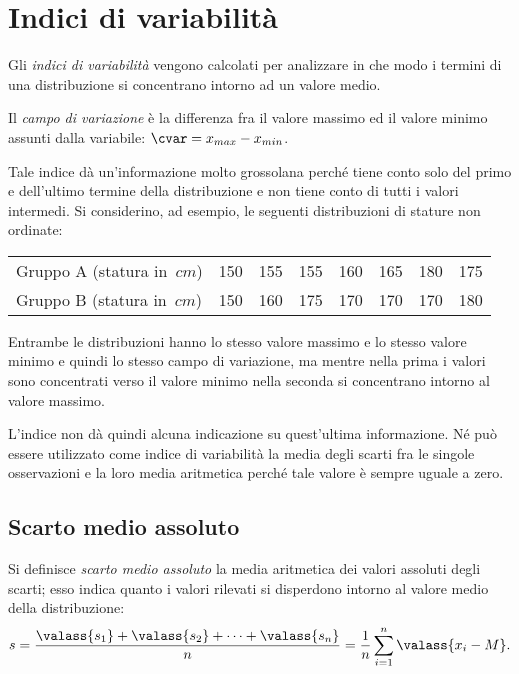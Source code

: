 \ovalbox{\risolvii \ref{ese:A.21}, \ref{ese:A.22}, \ref{ese:A.23}, \ref{ese:A.24}, \ref{ese:A.25}, \ref{ese:A.26}, \ref{ese:A.27}, \ref{ese:A.28}, \ref{ese:A.29}, \ref{ese:A.30}, \ref{ese:A.31}}

\vspazio\ovalbox{\ref{ese:A.32}}
\section{Indici di variabilità}

Gli \emph{indici di variabilità} vengono calcolati per analizzare in che modo i termini di una distribuzione si concentrano intorno ad un valore medio.

\begin{definizione}
Il \emph{campo di variazione} è la differenza fra il valore massimo ed il valore minimo assunti dalla
variabile: $\cvar = x_{max} - x_{min}$.
\end{definizione}

Tale indice dà un'informazione molto grossolana perché tiene conto solo del primo e dell'ultimo termine della
distribuzione e non tiene conto di tutti i valori intermedi. Si considerino, ad esempio, le seguenti distribuzioni di stature non ordinate:
\begin{center}
 \begin{tabular}{lccccccc}
 \toprule
 Gruppo A (statura in~$\unit{cm}$) & 150 & 155 & 155 & 160 & 165 & 180 & 175 \\
 Gruppo B (statura in~$\unit{cm}$) & 150 & 160 & 175 & 170 & 170 & 170 & 180 \\
 \bottomrule
\end{tabular}
\end{center}

Entrambe le distribuzioni hanno lo stesso valore massimo e lo stesso valore minimo e quindi lo stesso campo di
variazione, ma mentre nella prima i valori sono concentrati verso il valore minimo nella seconda si concentrano intorno al valore massimo.

L'indice non dà quindi alcuna indicazione su quest'ultima informazione. Né può essere utilizzato come indice di
variabilità la media degli scarti fra le singole osservazioni e la loro media aritmetica perché tale valore è sempre uguale a zero.

\subsection{Scarto medio assoluto}

\begin{definizione}
Si definisce \emph{scarto medio assoluto} la media aritmetica dei valori assoluti degli scarti; esso indica quanto i valori rilevati si disperdono
intorno al valore medio della distribuzione:
\[s=\frac{\valass{s_1}+\valass{s_2}+ \cdots +\valass{s_n}}{n}=\frac {1}{n}\sum_{i=1}^n \valass{x_i - M}.\]
\end{definizione}

